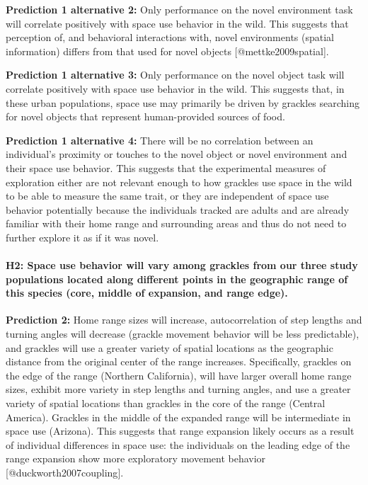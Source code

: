 \documentclass[]{article}
\let\oldparagraph\paragraph
\renewcommand{\paragraph}[1]{\oldparagraph{#1}\mbox{}}
\begin{document}
\textbf{Prediction 1 alternative 2:} Only performance on the novel
environment task will correlate positively with space use behavior in
the wild. This suggests that perception of, and behavioral interactions
with, novel environments (spatial information) differs from that used
for novel objects {[}@mettke2009spatial{]}.

\textbf{Prediction 1 alternative 3:} Only performance on the novel
object task will correlate positively with space use behavior in the
wild. This suggests that, in these urban populations, space use may
primarily be driven by grackles searching for novel objects that
represent human-provided sources of food.

\textbf{Prediction 1 alternative 4:} There will be no correlation
between an individual's proximity or touches to the novel object or
novel environment and their space use behavior. This suggests that the
experimental measures of exploration either are not relevant enough to
how grackles use space in the wild to be able to measure the same trait,
or they are independent of space use behavior potentially because the
individuals tracked are adults and are already familiar with their home
range and surrounding areas and thus do not need to further explore it
as if it was novel.

\paragraph{H2: Space use behavior will vary among grackles from our
three study populations located along different points in the geographic
range of this species (core, middle of expansion, and range
edge).}\label{h2-space-use-behavior-will-vary-among-grackles-from-our-three-study-populations-located-along-different-points-in-the-geographic-range-of-this-species-core-middle-of-expansion-and-range-edge.}

\textbf{Prediction 2:} Home range sizes will increase, autocorrelation
of step lengths and turning angles will decrease (grackle movement
behavior will be less predictable), and grackles will use a greater
variety of spatial locations as the geographic distance from the
original center of the range increases. Specifically, grackles on the
edge of the range (Northern California), will have larger overall home
range sizes, exhibit more variety in step lengths and turning angles,
and use a greater variety of spatial locations than grackles in the core
of the range (Central America). Grackles in the middle of the expanded
range will be intermediate in space use (Arizona). This suggests that
range expansion likely occurs as a result of individual differences in
space use: the individuals on the leading edge of the range expansion
show more exploratory movement behavior {[}@duckworth2007coupling{]}.
\end{document}
